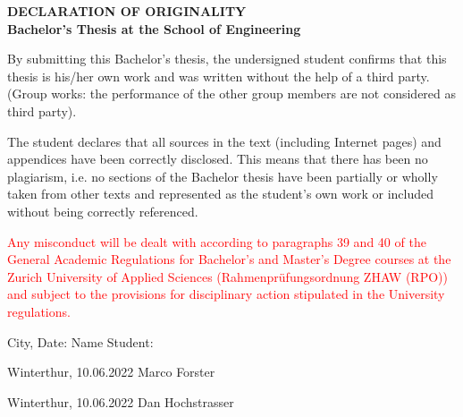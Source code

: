 \topskip 0pt
\vspace*{\fill}

\textbf{DECLARATION OF ORIGINALITY} \\
\textbf{Bachelor’s Thesis at the School of Engineering}

By submitting this Bachelor’s thesis, the undersigned student confirms that this thesis is his/her own work and was written without the help of a third party. (Group works: the performance of the other group members are not considered as third party).

The student declares that all sources in the text (including Internet pages) and appendices have been correctly disclosed. This means that there has been no plagiarism, i.e. no sections of the Bachelor thesis have been partially or wholly taken from other texts and represented as the student’s own work or included without being correctly referenced.

\textcolor{red}{Any misconduct will be dealt with according to paragraphs 39 and 40 of the General Academic Regulations for Bachelor’s and Master’s Degree courses at the Zurich University of Applied Sciences (Rahmenprüfungsordnung ZHAW (RPO)) and subject to the provisions for disciplinary action stipulated in the University regulations.}

\vspace{15mm}

City, Date: \hspace{35mm} Name Student:

Winterthur, 10.06.2022 \hspace{14mm} Marco Forster

Winterthur, 10.06.2022 \hspace{14mm} Dan Hochstrasser

\vspace*{\fill}
